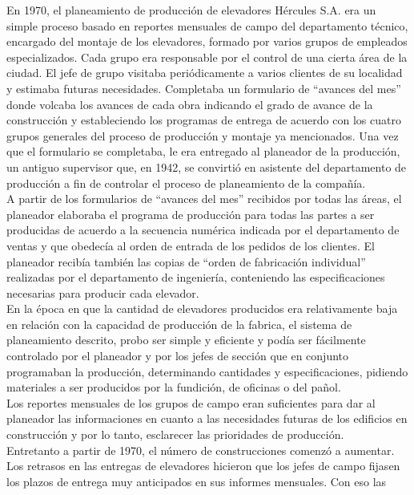 \documentclass[a4paper,10pt,titlepage]{article}
\begin{document}
En 1970, el planeamiento de producci\'on de elevadores H\'ercules S.A. era un simple
proceso basado en reportes mensuales de campo del departamento t\'ecnico,
encargado del montaje de los elevadores, formado por varios grupos de empleados
especializados. Cada grupo era responsable por el control de una cierta \'area de la
ciudad. El jefe de grupo visitaba peri\'odicamente a varios clientes de su localidad y
estimaba futuras necesidades. Completaba un formulario de ``avances del mes'' donde
volcaba los avances de cada obra indicando el grado de avance de la construcci\'on y
estableciendo los programas de entrega de acuerdo con los cuatro grupos generales
del proceso de producci\'on y montaje ya mencionados. Una vez que el formulario se
completaba, le era entregado al planeador de la producci\'on, un antiguo supervisor que,
en 1942, se convirti\'o en asistente del departamento de producci\'on a fin de controlar el
proceso de planeamiento de la compa\~n\'ia.\\
A partir de los formularios de ``avances del mes'' recibidos por todas las \'areas, el
planeador elaboraba el programa de producci\'on para todas las partes a ser producidas
de acuerdo a la secuencia num\'erica indicada por el departamento de ventas y que
obedec\'ia al orden de entrada de los pedidos de los clientes. El planeador recib\'ia
tambi\'en las copias de ``orden de fabricaci\'on individual'' realizadas por el departamento
de ingenier\'ia, conteniendo las especificaciones necesarias para producir cada
elevador.\\
En la \'epoca en que la cantidad de elevadores producidos era relativamente baja en
relaci\'on con la capacidad de producci\'on de la fabrica, el sistema de planeamiento
descrito, probo ser simple y eficiente y pod\'ia ser f\'acilmente controlado por el planeador
y por los jefes de secci\'on que en conjunto programaban la producci\'on, determinando
cantidades y especificaciones, pidiendo materiales a ser producidos por la fundici\'on, de
oficinas o del pa\~nol.\\
Los reportes mensuales de los grupos de campo eran suficientes para dar al planeador
las informaciones en cuanto a las necesidades futuras de los edificios en construcci\'on y
por lo tanto, esclarecer las prioridades de producci\'on.\\
Entretanto a partir de 1970, el n\'umero de construcciones comenz\'o a aumentar. Los
retrasos en las entregas de elevadores hicieron que los jefes de campo fijasen los
plazos de entrega muy anticipados en sus informes mensuales. Con eso las
\end{document}
